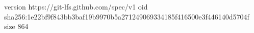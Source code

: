 version https://git-lfs.github.com/spec/v1
oid sha256:1e22bf9f843bb3baf19b9970b5a271249069334185f416500e3f446140d5704f
size 864
